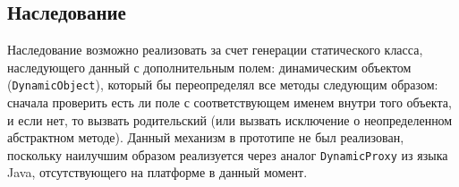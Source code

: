 \documentclass[times,specification,annotation]{itmo-student-thesis}
\begin{document}
\subsection{Наследование}
Наследование возможно реализовать за счет генерации статического класса, наследующего данный с дополнительным полем: динамическим объектом (\texttt{DynamicObject}), который бы переопределял все методы следующим образом: сначала проверить есть ли поле с соответствующем именем внутри того объекта, и если нет, то вызвать родительский (или вызвать исключение о неопределенном абстрактном методе). Данный механизм в прототипе не был реализован, поскольку наилучшим образом реализуется через аналог \texttt{DynamicProxy} из языка Java, отсутствующего на платформе в данный момент.
\end{document}
